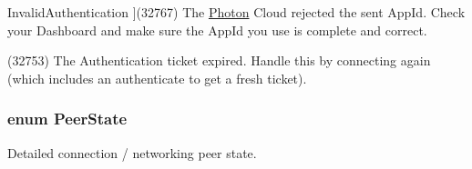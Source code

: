 \begin{Desc}
\begin{description}
{Invalid\+Authentication\hypertarget{group__public_api_ggad61b1461cf60ad9e8d86923d111d5cc9ab67551dad56fc73fd4a580e810dc5f7f}{}\label{group__public_api_ggad61b1461cf60ad9e8d86923d111d5cc9ab67551dad56fc73fd4a580e810dc5f7f}
}](32767) The \hyperlink{namespace_photon}{Photon} Cloud rejected the sent App\+Id. Check your Dashboard and make sure the App\+Id you use is complete and correct.\item[{\em 
Authentication\+Ticket\+Expired\hypertarget{group__public_api_ggad61b1461cf60ad9e8d86923d111d5cc9a65537dc549af3f90695ff7cf0002b17b}{}\label{group__public_api_ggad61b1461cf60ad9e8d86923d111d5cc9a65537dc549af3f90695ff7cf0002b17b}
}](32753) The Authentication ticket expired. Handle this by connecting again (which includes an authenticate to get a fresh ticket).\end{description}
\end{Desc}
\subsubsection[{\texorpdfstring{Peer\+State}{PeerState}}]{\setlength{\rightskip}{0pt plus 5cm}enum {\bf Peer\+State}\hspace{0.3cm}{\ttfamily [strong]}}\hypertarget{group__public_api_ga91cc003c03acb26c6f1530440ebdbc88}{}\label{group__public_api_ga91cc003c03acb26c6f1530440ebdbc88}


Detailed connection / networking peer state. 

